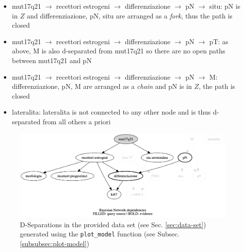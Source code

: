 \begin{itemize}
  \item mut17q21 $\rightarrow$ recettori estrogeni $\rightarrow$ differenziazione $\rightarrow$ pN $\rightarrow$ situ: pN is in $Z$ and differenziazione, pN, situ are arranged as a \textit{fork}, thus the path is closed
  \item mut17q21 $\rightarrow$ recettori estrogeni $\rightarrow$ differenziazione $\rightarrow$ pN $\rightarrow$ pT: as above, M is also d-separated from mut17q21 so there are no open paths between mut17q21 and pN
  \item mut17q21 $\rightarrow$ recettori estrogeni $\rightarrow$ differenziazione $\rightarrow$ pN $\rightarrow$ M: differenziazione, pN, M are arranged as a \textit{chain} and pN is in $Z$, the path is closed
  \item lateralita: lateralita is not connected to any other node and is thus d-separated from all others a priori
\end{itemize}

\begin{figure}[htbp]
\centerline{\includegraphics[width=\columnwidth]{methodology/images/d-separation-example}}
\caption{D-Separations in the provided data set (see Sec. \ref{sec:data-set}) generated using the \texttt{plot\_model} function (see Subsec. \ref{subsubsec:plot-model})}
\label{fig:d-separation_example}
\end{figure}


